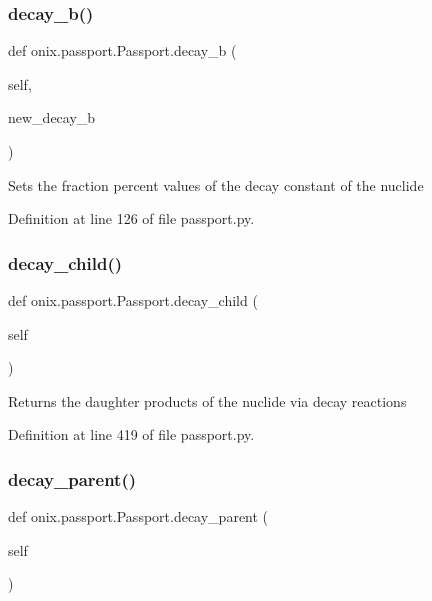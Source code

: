\subsubsection{\texorpdfstring{decay\+\_\+b()}{decay\_b()}\hspace{0.1cm}{\footnotesize\ttfamily [2/2]}}
{\footnotesize\ttfamily def onix.\+passport.\+Passport.\+decay\+\_\+b (\begin{DoxyParamCaption}\item[{}]{self,  }\item[{}]{new\+\_\+decay\+\_\+b }\end{DoxyParamCaption})}

\begin{DoxyVerb}Sets the fraction percent values of the decay constant of the nuclide\end{DoxyVerb}
 

Definition at line 126 of file passport.\+py.

\mbox{\label{classonix_1_1passport_1_1Passport_a86050bef8c6adbb3c46b021dd2401e09}} 
\subsubsection{\texorpdfstring{decay\+\_\+child()}{decay\_child()}}
{\footnotesize\ttfamily def onix.\+passport.\+Passport.\+decay\+\_\+child (\begin{DoxyParamCaption}\item[{}]{self }\end{DoxyParamCaption})}

\begin{DoxyVerb}Returns the daughter products of the nuclide via decay reactions\end{DoxyVerb}
 

Definition at line 419 of file passport.\+py.

\mbox{\label{classonix_1_1passport_1_1Passport_a130d29001a8e8d15830b799006d2c745}} 
\subsubsection{\texorpdfstring{decay\+\_\+parent()}{decay\_parent()}}
{\footnotesize\ttfamily def onix.\+passport.\+Passport.\+decay\+\_\+parent (\begin{DoxyParamCaption}\item[{}]{self }\end{DoxyParamCaption})}

